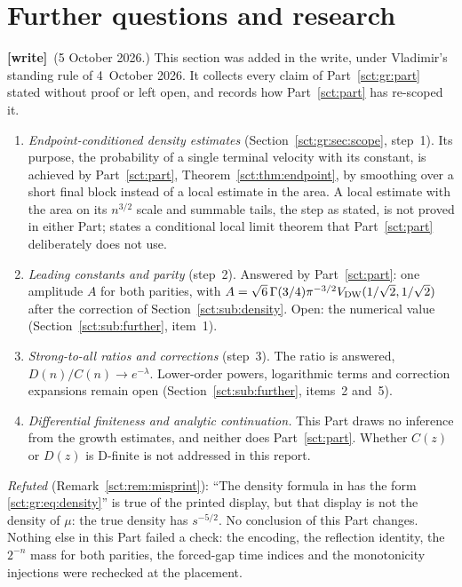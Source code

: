 \documentclass[11pt,letterpaper]{article}
\theoremstyle{definition}\newtheorem{remark}[theorem]{Remark}
\newcommand{\wtag}{\textup{\textbf{[write]}}}
\begin{document}
\section{Further questions and research}\label{sct:gr:sec:further}
\wtag\ (5 October 2026.) This section was added in the write, under Vladimir's standing rule of 4~October 2026. It collects every claim of Part~\ref{sct:gr:part} stated without proof or left open, and records how Part~\ref{sct:part} has re-scoped it.
\begin{enumerate}
\item \emph{Endpoint-conditioned density estimates} (Section~\ref{sct:gr:sec:scope}, step~1). Its purpose, the probability of a single terminal velocity with its constant, is achieved by Part~\ref{sct:part}, Theorem~\ref{sct:thm:endpoint}, by smoothing over a short final block instead of a local estimate in the area. A local estimate with the area on its $n^{3/2}$ scale and summable tails, the step as stated, is not proved in either Part; \cite[(12)]{dw} states a conditional local limit theorem that Part~\ref{sct:part} deliberately does not use.
\item \emph{Leading constants and parity} (step~2). Answered by Part~\ref{sct:part}: one amplitude $A$ for both parities, with $A=\sqrt6\,\Gamma(3/4)\pi^{-3/2}V_{\mathrm{DW}}(1/\sqrt2,1/\sqrt2)$ after the correction of Section~\ref{sct:sub:density}. Open: the numerical value (Section~\ref{sct:sub:further}, item~1).
\item \emph{Strong-to-all ratios and corrections} (step~3). The ratio is answered, $D(n)/C(n)\to e^{-\lambda}$. Lower-order powers, logarithmic terms and correction expansions remain open (Section~\ref{sct:sub:further}, items~2 and~5).
\item \emph{Differential finiteness and analytic continuation.} This Part draws no inference from the growth estimates, and neither does Part~\ref{sct:part}. Whether $C(z)$ or $D(z)$ is D-finite is not addressed in this report.
\end{enumerate}
\emph{Refuted} (Remark~\ref{sct:rem:misprint}): ``The density formula in \cite[Theorem~1]{dw} has the form \eqref{sct:gr:eq:density}'' is true of the printed display, but that display is not the density of $\mu$: the true density has $s^{-5/2}$. No conclusion of this Part changes. Nothing else in this Part failed a check: the encoding, the reflection identity, the $2^{-n}$ mass for both parities, the forced-gap time indices and the monotonicity injections were rechecked at the placement.
\clearpage
\end{document}
